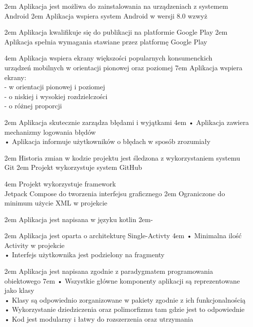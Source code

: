 {2em}{
    Aplikacja jest możliwa do zainstalowania na urządzeniach z systemem Android
}
{2em}{
    Aplikacja wspiera system Android w wersji 8.0 wzwyż
}

{2em}{
    Aplikacja kwalifikuje się do publikacji na platformie Google Play
}
{2em}{
    Aplikacja spełnia wymagania stawiane przez platformę Google Play
}

{4em}{
    Aplikacja wspiera ekrany większości popularnych konsumenckich\\
    urządzeń mobilnych w orientacji pionowej oraz poziomej
}
{7em}{
    Aplikacja wspiera ekrany:\\
    - w orientacji pionowej i poziomej\\
    - o niskiej i wysokiej rozdzielczości\\
    - o różnej proporcji
}

{2em}{
    Aplikacja skutecznie zarządza błędami i wyjątkami
}
{4em}{
    • Aplikacja zawiera mechanizmy logowania błędów\\
    • Aplikacja informuje użytkowników o błędach w sposób zrozumiały
}

{2em}{
    Historia zmian w kodzie projektu jest śledzona z wykorzystaniem systemu Git
}
{2em}{
    Projekt wykorzystuje system GitHub
}

{4em}{
    Projekt wykorzystuje framework\\
    Jetpack Compose do tworzenia interfejsu graficznego
}
{2em}{
    Ograniczone do minimum użycie XML w projekcie
}

{2em}{
    Aplikacja jest napisana w języku kotlin
}
{2em}{-}

{2em}{
    Aplikacja jest oparta o architekturę Single-Activty
}
{4em}{
    • Minimalna ilość Activity w projekcie\\
    • Interfejs użytkownika jest podzielony na fragmenty
}

{2em}{
    Aplikacja jest napisana zgodnie z paradygmatem programowania obiektowego
}
{7em}{
    • Wszystkie główne komponenty aplikacji są reprezentowane jako klasy\\
    • Klasy są odpowiednio zorganizowane w pakiety zgodnie z ich funkcjonalnością\\
    • Wykorzystanie dziedziczenia oraz polimorfizmu tam gdzie jest to odpowiednie\\
    • Kod jest modularny i łatwy do rozszerzenia oraz utrzymania
}

